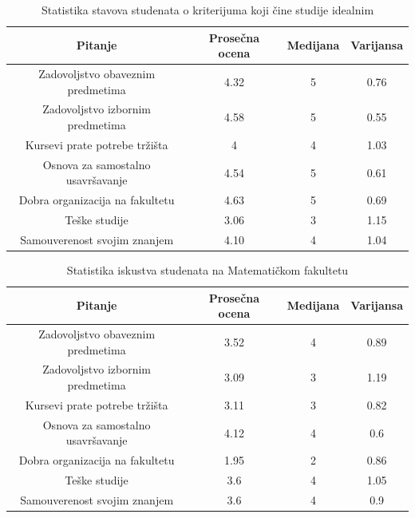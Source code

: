 \documentclass[a4paper]{article}
\begin{document}
\begin{table}[h!]
\begin{center}
\caption{Statistika stavova studenata o kriterijuma koji čine studije idealnim}
\begin{tabular}{|c|c|c|c|} \hline
Pitanje & Prosečna ocena & Medijana & Varijansa \\ \hline
Zadovoljstvo obaveznim predmetima & 4.32 & 5 & 0.76\\ \hline
Zadovoljstvo izbornim predmetima & 4.58 & 5 & 0.55\\ \hline
Kursevi prate potrebe tržišta & 4 & 4 & 1.03\\ \hline
Osnova za samostalno usavršavanje & 4.54 & 5 & 0.61\\ \hline
Dobra organizacija na fakultetu & 4.63 & 5 & 0.69 \\ \hline
Teške studije & 3.06 & 3 & 1.15 \\ \hline
Samouverenost svojim znanjem & 4.10 & 4 & 1.04 \\ \hline
\end{tabular}
\label{tab:tabela2}

\end{center}
\end{table}

\begin{table}[h!]
\begin{center}
\caption{Statistika iskustva studenata na Matematičkom fakultetu}
\begin{tabular}{|c|c|c|c|} \hline
Pitanje & Prosečna ocena & Medijana & Varijansa \\ \hline
Zadovoljstvo obaveznim predmetima & 3.52 & 4 & 0.89\\ \hline
Zadovoljstvo izbornim predmetima & 3.09 & 3 & 1.19\\ \hline
Kursevi prate potrebe tržišta & 3.11 & 3 & 0.82\\ \hline
Osnova za samostalno usavršavanje & 4.12 & 4 & 0.6\\ \hline
Dobra organizacija na fakultetu & 1.95 & 2 & 0.86 \\ \hline
Teške studije & 3.6 & 4 & 1.05 \\ \hline
Samouverenost svojim znanjem & 3.6 & 4 & 0.9 \\ \hline
\end{tabular}
\label{tab:tabela3}

\end{center}
\end{table}

  
    
 
\end{document}

